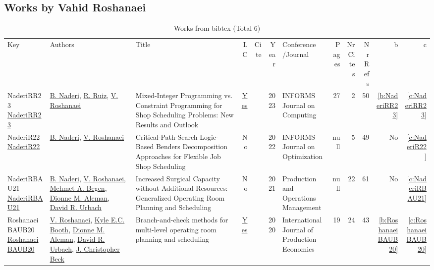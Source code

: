 \subsection{Works by Vahid Roshanaei}
\label{sec:a737}
{\scriptsize
\begin{longtable}{>{\raggedright\arraybackslash}p{3cm}>{\raggedright\arraybackslash}p{6cm}>{\raggedright\arraybackslash}p{6.5cm}rrrp{2.5cm}rrrrr}
\rowcolor{white}\caption{Works from bibtex (Total 6)}\\ \toprule
\rowcolor{white}Key & Authors & Title & LC & Cite & Year & \shortstack{Conference\\/Journal} & Pages & \shortstack{Nr\\Cites} & \shortstack{Nr\\Refs} & b & c \\ \midrule\endhead
\bottomrule
\endfoot
NaderiRR23 \href{https://doi.org/10.1287/ijoc.2023.1287}{NaderiRR23} & \hyperref[auth:a735]{B. Naderi}, \hyperref[auth:a736]{R. Ruiz}, \hyperref[auth:a737]{V. Roshanaei} & Mixed-Integer Programming vs. Constraint Programming for Shop Scheduling Problems: New Results and Outlook & \href{works/NaderiRR23.pdf}{Yes} & \cite{NaderiRR23} & 2023 & INFORMS Journal on Computing & 27 & 2 & 50 & \ref{b:NaderiRR23} & \ref{c:NaderiRR23}\\
NaderiR22 \href{http://dx.doi.org/10.1287/ijoo.2021.0056}{NaderiR22} & \hyperref[auth:a735]{B. Naderi}, \hyperref[auth:a737]{V. Roshanaei} & Critical-Path-Search Logic-Based Benders Decomposition Approaches for Flexible Job Shop Scheduling & No & \cite{NaderiR22} & 2022 & INFORMS Journal on Optimization & null & 5 & 49 & No & \ref{c:NaderiR22}\\
NaderiRBAU21 \href{http://dx.doi.org/10.1111/poms.13397}{NaderiRBAU21} & \hyperref[auth:a735]{B. Naderi}, \hyperref[auth:a737]{V. Roshanaei}, \hyperref[auth:a849]{Mehmet A. Begen}, \hyperref[auth:a913]{Dionne M. Aleman}, \hyperref[auth:a914]{David R. Urbach} & Increased Surgical Capacity without Additional Resources: Generalized Operating Room Planning and Scheduling & No & \cite{NaderiRBAU21} & 2021 & Production and Operations Management & null & 22 & 61 & No & \ref{c:NaderiRBAU21}\\
RoshanaeiBAUB20 \href{http://dx.doi.org/10.1016/j.ijpe.2019.07.006}{RoshanaeiBAUB20} & \hyperref[auth:a737]{V. Roshanaei}, \hyperref[auth:a1004]{Kyle E.C. Booth}, \hyperref[auth:a913]{Dionne M. Aleman}, \hyperref[auth:a914]{David R. Urbach}, \hyperref[auth:a89]{J. Christopher Beck} & Branch-and-check methods for multi-level operating room planning and scheduling & \href{works/RoshanaeiBAUB20.pdf}{Yes} & \cite{RoshanaeiBAUB20} & 2020 & International Journal of Production Economics & 19 & 24 & 43 & \ref{b:RoshanaeiBAUB20} & \ref{c:RoshanaeiBAUB20}\\

\end{longtable}}

